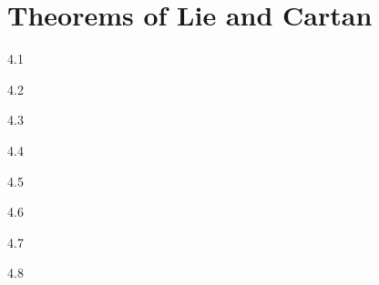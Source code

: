 \chapter{Theorems of Lie and Cartan}

\begin{solution}{}{4.1}
    
\end{solution}

\begin{solution}{}{4.2}

\end{solution}

\begin{solution}{}{4.3}
    
\end{solution}

\begin{solution}{}{4.4}

\end{solution}

\begin{solution}{}{4.5}
    
\end{solution}

\begin{solution}{}{4.6}

\end{solution}

\begin{solution}{}{4.7}
    
\end{solution}

\begin{solution}{}{4.8}

\end{solution}
